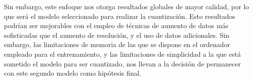 Sin embargo, este enfoque nos otorga resultados globales de mayor calidad, por lo que será el modelo seleccionado para realizar la cuantización. Esto resultados podrían ser mejorables con el empleo de técnicas de aumento de datos más sofisticadas que el aumento de resolución, y el uso de datos adicionales. Sin embargo, las limitaciones de memoria de las que se dispone en el ordenador empleado para el entrenamiento,  y las limitaciones de simplicidad a la que está sometido el modelo para ser cuantizado, nos llevan a la decisión de permanecer con este segundo modelo como hipótesis final.

